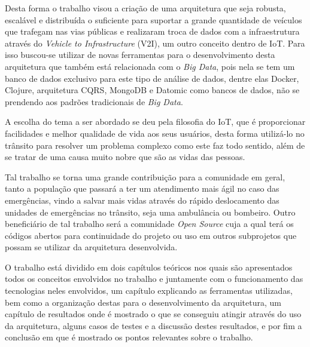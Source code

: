 Desta forma o trabalho visou a criação de uma arquitetura que seja robusta, escalável e distribuída o suficiente para suportar a grande quantidade de veículos que trafegam nas vias públicas e realizaram troca de dados com a infraestrutura através do \textit{Vehicle to Infrastructure} (V2I), um outro conceito dentro de IoT. Para isso buscou-se utilizar de novas ferramentas para o desenvolvimento desta arquitetura que também está relacionada com o \textit{Big Data}, pois nela se tem um banco de dados exclusivo para este tipo de análise de dados, dentre elas Docker, Clojure, arquitetura CQRS, MongoDB e Datomic como bancos de dados, não se prendendo aos padrões tradicionais de \textit{Big Data}.

A escolha do tema a ser abordado se deu pela filosofia do IoT, que é proporcionar facilidades e melhor qualidade de vida aos seus usuários, desta forma utilizá-lo no trânsito para resolver um problema complexo como este faz todo sentido, além de se tratar de uma causa muito nobre que são as vidas das pessoas.

Tal trabalho se torna uma grande contribuição para a comunidade em geral, tanto a população que passará a ter um atendimento mais ágil no caso das emergências, vindo a salvar mais vidas através do rápido deslocamento das unidades de emergências no trânsito, seja uma ambulância ou bombeiro. Outro beneficiário de tal trabalho será a comunidade \textit{Open Source} cuja a qual terá os códigos abertos para continuidade do projeto ou uso em outros subprojetos que possam se utilizar da arquitetura desenvolvida.

O trabalho está dividido em dois capítulos teóricos nos quais são apresentados todos os conceitos envolvidos no trabalho e juntamente com o funcionamento das tecnologias neles envolvidos, um capítulo explicando as ferramentas utilizadas, bem como a organização destas para o desenvolvimento da arquitetura, um capítulo de resultados onde é mostrado o que se conseguiu atingir através do uso da arquitetura, alguns casos de testes e a discussão destes resultados, e por fim a conclusão em que é mostrado os pontos relevantes sobre o trabalho.
